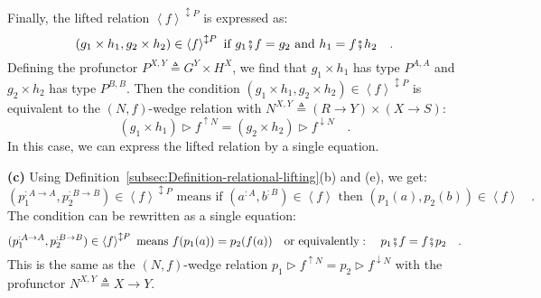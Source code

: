 Finally, the lifted relation $\left<f\right>^{\updownarrow P}$ is
expressed as:
\[
(g_{1}\times h_{1},g_{2}\times h_{2})\in\left<f\right>^{\updownarrow P}\text{ if }g_{1}\bef f=g_{2}\text{ and }h_{1}=f\bef h_{2}\quad.
\]
Defining the profunctor $P^{X,Y}\triangleq G^{Y}\times H^{X}$, we
find that $g_{1}\times h_{1}$ has type $P^{A,A}$ and $g_{2}\times h_{2}$
has type $P^{B,B}$. Then the condition $(g_{1}\times h_{1},g_{2}\times h_{2})\in\left<f\right>^{\updownarrow P}$
is equivalent to the $\left(N,f\right)$-wedge relation with $N^{X,Y}\triangleq\left(R\rightarrow Y\right)\times\left(X\rightarrow S\right)$:
\[
(g_{1}\times h_{1})\triangleright f^{\uparrow N}=(g_{2}\times h_{2})\triangleright f^{\downarrow N}\quad.
\]
In this case, we can express the lifted relation by a single equation.

\textbf{(c)} Using Definition~\ref{subsec:Definition-relational-lifting}(b)
and (e), we get:
\[
(p_{1}^{:A\rightarrow A},p_{2}^{:B\rightarrow B})\in\left<f\right>^{\updownarrow P}\text{ means if }(a^{:A},b^{:B})\in\left<f\right>\text{ then }(p_{1}(a),p_{2}(b))\in\left<f\right>\quad.
\]
The condition can be rewritten as a single equation:
\[
(p_{1}^{:A\rightarrow A},p_{2}^{:B\rightarrow B})\in\left<f\right>^{\updownarrow P}\text{ means }f(p_{1}(a))=p_{2}(f(a))\quad\text{or equivalently}:\quad p_{1}\bef f=f\bef p_{2}\quad.
\]
This is the same as the $\left(N,f\right)$-wedge relation $p_{1}\triangleright f^{\uparrow N}=p_{2}\triangleright f^{\downarrow N}$
with the profunctor $N^{X,Y}\triangleq X\rightarrow Y$.

